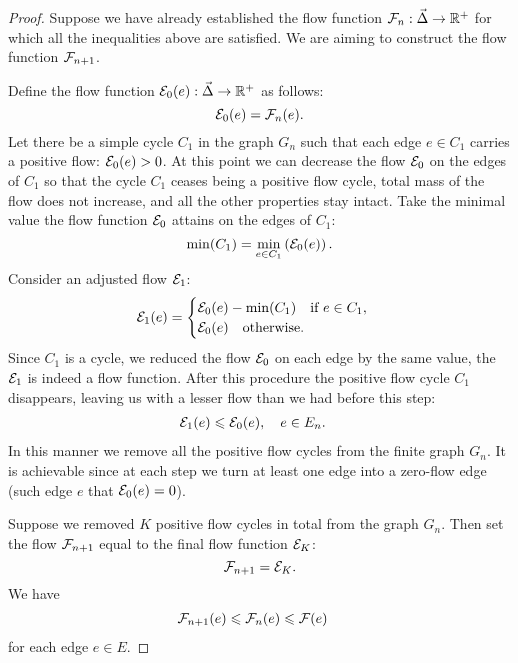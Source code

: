 \documentclass[12pt]{amsart}
\begin{document}
\begin{proof}
      Suppose we have already established the flow function $\flowposn{n}: \onet \to \mathbb{R}^{+}$ for which
        all the inequalities above are satisfied.
      We are aiming to construct the flow function $\flowposn{n+1}$.

      Define the flow function $\cal{E}_0(e): \onet \to \mathbb{R}^{+}$ as follows:
      \[
        \cal{E}_0(e) = \flowposn{n}(e).
      \]
      Let there be a simple cycle $C_1$ in the graph $G_n$ such that each edge $e \in C_1$ carries
        a positive flow: $\cal{E}_0(e) > 0$.
      At this point we can decrease the flow $\cal{E}_0$ on the edges of $C_1$ so that the cycle $C_1$
        ceases being a positive flow cycle, total mass of the flow does not increase, and all the other properties stay intact.
      Take the minimal value the flow function $\cal{E}_0$ attains on the edges of $C_1$:
        \[
          \min(C_1) = \min_{e \in C_1}\left(\cal{E}_0(e)\right).
        \]
      Consider an adjusted flow $\cal{E}_1$:
      \begin{equation*}
        \cal{E}_1(e) =
        \begin{cases}
          \cal{E}_0(e) - \min(C_1) \quad \text{if } e \in C_1,\\
          \cal{E}_0(e) \quad \text{otherwise}.
        \end{cases}
      \end{equation*}
      Since $C_1$ is a cycle, we reduced the flow $\cal{E}_0$ on each edge by the same value,
        the $\cal{E}_1$ is indeed a flow function.
      After this procedure the positive flow cycle $C_1$ disappears,
        leaving us with a lesser flow than we had before this step:
      \begin{align*}
        &\cal{E}_1(e) \leq \cal{E}_0(e), \quad e \in E_n.
      \end{align*}
      In this manner we remove all the positive flow cycles from the finite graph $G_n$.
      It is achievable since at each step we turn at least one edge into a zero-flow edge (such edge $e$ that $\cal{E}_0(e) = 0$).

      Suppose we removed $K$ positive flow cycles in total from the graph $G_n$.
      Then set the flow $\flowposn{n+1}$ equal to the final flow function $\cal{E}_K$:
      \[
        \flowposn{n+1} = \cal{E}_K.
      \]
      We have
      \begin{align*}
        &\flowposn{n+1}(e) \leq \flowposn{n}(e) \leq \flowpos(e)
      \end{align*}
        for each edge $e \in E$.


\end{proof}
\end{document}
